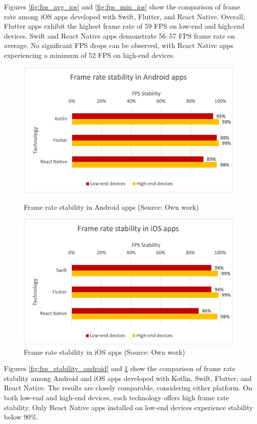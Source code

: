 Figures \ref{fig:fps_avg_ios} and \ref{fig:fps_min_ios} show the comparison of frame rate among iOS apps developed with Swift, Flutter, and React Native. Overall, Flutter apps exhibit the highest frame rate of 59 FPS on low-end and high-end devices. Swift and React Native apps demonstrate 56--57 FPS frame rate on average. No significant FPS drops can be observed, with React Native apps experiencing a minimum of 52 FPS on high-end devices.

\begin{figure}[H]
    \begin{minipage}{.48\textwidth}
        \includegraphics[width=\textwidth]{img/fps_stability_android}
        \caption{Frame rate stability in Android apps (Source: Own work)}
        \label{fig:fps_stability_android}
    \end{minipage}
    \hfill
    \begin{minipage}{.48\textwidth}
        \includegraphics[width=\textwidth]{img/fps_stability_ios}
        \caption{Frame rate stability in iOS apps (Source: Own work)}
        \label{fig:fps_stability_ios}
    \end{minipage}
\end{figure}

Figures \ref{fig:fps_stability_android} and \ref{fig:fps_stability_ios} show the comparison of frame rate stability among Android and iOS apps developed with Kotlin, Swift, Flutter, and React Native. The results are closely comparable, considering either platform. On both low-end and high-end devices, each technology offers high frame rate stability. Only React Native apps installed on low-end devices experience stability below 90\%.
